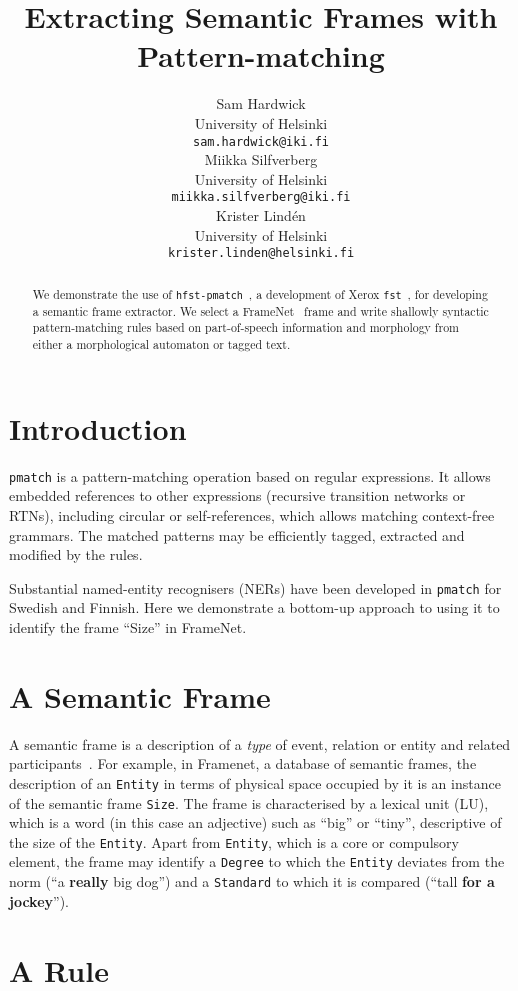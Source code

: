\documentclass[11pt]{article}
\title{Extracting Semantic Frames with Pattern-matching}
\author{Sam Hardwick \\
  University of Helsinki \\
  {\tt sam.hardwick@iki.fi} \\\And
  Miikka Silfverberg \\
  University of Helsinki \\
  {\tt miikka.silfverberg@iki.fi}\\\And
  Krister Lind{é}n \\
  University of Helsinki \\
  {\tt krister.linden@helsinki.fi}}
\date{}
\begin{document}
\maketitle
\begin{abstract}
  We demonstrate the use of \verb+hfst-pmatch+~, a development of Xerox
  \verb+fst+~, for developing a semantic frame extractor. We
  select a FrameNet~ frame and write shallowly syntactic pattern-matching rules
  based on part-of-speech information and morphology from either a morphological automaton or
  tagged text.
\end{abstract}

\section{Introduction}
\verb+pmatch+ is a pattern-matching operation based on regular expressions. It
allows embedded references to other expressions (recursive transition networks
or RTNs), including circular or self-references, which allows matching
context-free grammars. The matched patterns may be efficiently tagged, extracted
and modified by the rules.

Substantial named-entity recognisers (NERs) have been developed in
\verb+pmatch+ for Swedish and Finnish. Here we demonstrate a bottom-up approach
to using it to identify the frame ``Size'' in FrameNet.

\section{A Semantic Frame}

A semantic frame is a description of a \emph{type} of event, relation or entity
and related participants~. For example, in Framenet,
a database of semantic frames,
the description of an \verb+Entity+ in terms of physical space occupied by it is
an instance of the semantic frame \verb+Size+. The frame is characterised by
a lexical unit (LU), which is a word (in this case an adjective)
such as ``big'' or ``tiny'', descriptive of the size of the \verb+Entity+.
Apart from \verb+Entity+, which is a core or compulsory element, the
frame may identify a \verb+Degree+ to which the \verb+Entity+ deviates
from the norm (``a \textbf{really} big dog'') and a \verb+Standard+ to
which it is compared (``tall \textbf{for a jockey}'').

\section{A Rule}
\end{document}
